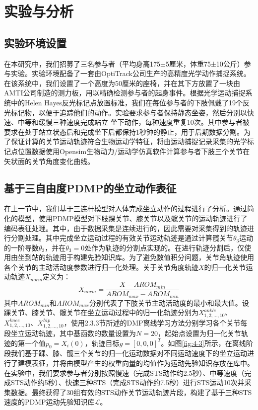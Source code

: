 \section{实验与分析}
\subsection{实验环境设置} 
在本研究中，我们招募了三名参与者（平均身高175±5厘米，体重75±10公斤）参与实验。实验环境配备了一套由OptiTrack公司生产的高精度光学动作捕捉系统。在该系统中，我们设置了一个高度为50厘米的座椅，并在其下方放置了一块由AMTI公司制造的测力板，用以精确检测参与者的起身事件。根据光学运动捕捉系统中的Helen Hayes反光标记点放置标准，我们在每位参与者的下肢佩戴了19个反光标记物，以便于追踪他们的动作。实验要求参与者保持静态坐姿，然后分别以快速、中等和缓慢三种速度完成站立-坐下动作，每种速度重复10次。其中参与者被要求在处于站立状态后和完成坐下后都保持1秒钟的静止，用于后期数据分割。为了保证计算的关节运动轨迹符合生物运动学特征，将由运动捕捉记录采集的光学标记点位置数据使用Opensim生物动力/运动学仿真软件计算参与者下肢三个关节在矢状面的关节角度变化曲线。

\subsection{基于三自由度PDMP的坐立动作表征} 
在上一节中，我们基于三连杆模型对人体完成坐立动作的过程进行了分析。通过简化的模型，使用PDMP模型对下肢踝关节、膝关节以及髋关节的运动轨迹进行了编码表征处理。其中，由于数据采集是连续进行的，因此需要对采集得到的轨迹进行分割处理。其中完成坐立运动过程的有效关节运动轨迹是通过计算髋关节$\theta_3$运动的一阶导数$\dot\theta_3$，并在$\dot\theta_3=0$处作为轨迹的分割点实现的。在进行轨迹分割后，仅使用由坐到站的轨迹用于构建先验知识库。为了避免数值积分问题，关节角轨迹使用各个关节的主动活动度参数进行归一化处理。关于关节角度轨迹$X$的归一化关节运动轨迹$X_{norm}$定义为：
\begin{equation}
    X_{norm} = \frac{X-AROM_{min}}{AROM_{max}-AROM_{min}}
    \label{eq:4-39}
\end{equation}
其中$AROM_{min}$和$AROM_{max}$分别代表了下肢关节主动活动度的最小和最大值。设踝关节、膝关节、髋关节在坐立运动过程中的归一化轨迹分别为$X_{1,2,...,10}^{ankle}$、$X_{1,2,...,10}^{knee}$、$X_{1,2,...,10}^{hip}$，使用2.3.3节所述的DMP离线学习方法分别学习各个关节每段坐立运动轨迹，其中基函数的数量设置为$N=20$，起始点设置为归一化关节轨迹的第一个值$p_0=X_i(0)$，轨迹目标$g=[0,0,0]^T$。如图\ref{fig:4-3}所示，在离线阶段我们基于踝、膝、髋三个关节的归一化运动数据对不同运动速度下的坐立运动进行了建模表征，并将由模型产生的权重向量的均值作为运动先验知识存放在库中。在实验中，我们要求参与者分别按照慢速（完成STS动作约2.5秒）、中等速度（完成STS动作约5秒）、快速三种STS（完成STS动作约7.5秒）进行STS运动10次并采集数据。最终获得了30组有效的STS动作关节运动轨迹片段，构建了基于三种STS速度的PDMP运动先验知识库$\mathscr{L}$。

